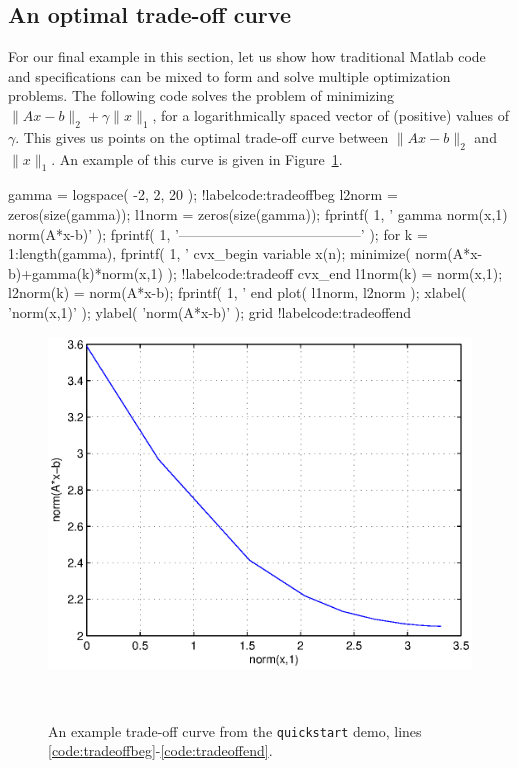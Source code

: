 \documentclass[12pt]{article}
\begin{document}
\subsection{An optimal trade-off curve}

For our final example in this section, let us show how traditional
Matlab code and \cvx specifications can be mixed to form and solve
multiple optimization problems. The following code solves the problem
of minimizing $\|Ax-b\|_2 +\gamma \|x\|_1$,
for a logarithmically spaced vector
of (positive) values of $\gamma$. This gives us points on the optimal
trade-off curve between $\|Ax-b\|_2$ and $\|x\|_1$. An example of this
curve is given in Figure~\ref{fig:tradeoff}.
\begin{code2}[firstnumber=268]
	gamma = logspace( -2, 2, 20 ); !label{code:tradeoffbeg}
	l2norm = zeros(size(gamma));
	l1norm = zeros(size(gamma));
	fprintf( 1, '   gamma       norm(x,1)    norm(A*x-b)\n' );
	fprintf( 1, '---------------------------------------\n' );
	for k = 1:length(gamma),
	    fprintf( 1, '%
	    cvx_begin
	        variable x(n);
	        minimize( norm(A*x-b)+gamma(k)*norm(x,1) );	!label{code:tradeoff}
	    cvx_end
	    l1norm(k) = norm(x,1);
	    l2norm(k) = norm(A*x-b);
	    fprintf( 1, '   %
	end
	plot( l1norm, l2norm );
	xlabel( 'norm(x,1)' );
	ylabel( 'norm(A*x-b)' );
	grid !label{code:tradeoffend}
\end{code2}
\begin{figure}
\begin{center}
\includegraphics[width=4.5in]{tradeoff.eps}
\end{center}
~\\[-48pt]
\caption{An example trade-off curve from the \texttt{quickstart} demo, lines \ref{code:tradeoffbeg}-\ref{code:tradeoffend}.}
\label{fig:tradeoff}
\end{figure}
\end{document}
